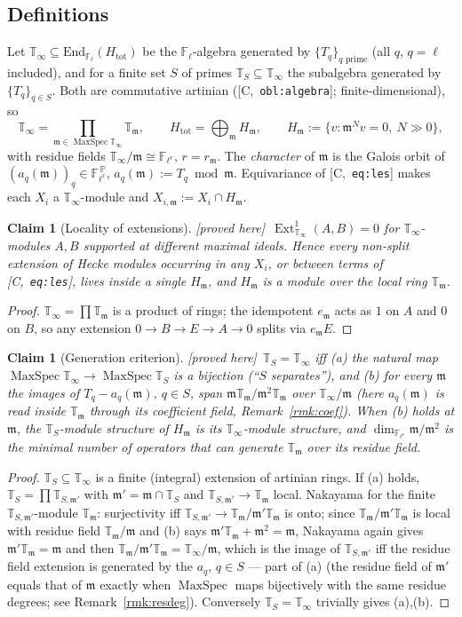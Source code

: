 \documentclass[11pt]{article}
\newtheorem{claim}[theorem]{Claim}
\theoremstyle{remark}
\newcommand{\F}{\mathbb{F}}
\newcommand{\End}{\mathrm{End}}
\newcommand{\Fl}{\F_\ell}
\newcommand{\Flr}{\F_{\ell^r}}
\DeclareMathOperator{\Ext}{Ext}
\DeclareMathOperator{\MaxSpec}{MaxSpec}
\newcommand{\T}{\mathbb{T}}
\newcommand{\m}{\mathfrak{m}}
\newcommand{\Htot}{H_{\mathrm{tot}}}
\newcommand{\HA}[1]{[C,~\texttt{#1}]}      %
\newcommand{\PROVED}{\textsf{[proved here]}}
\begin{document}
\subsection{Definitions}
Let $\T_\infty\subseteq\End_{\Fl}(\Htot)$ be the $\Fl$-algebra generated by $\{T_q\}_{q\text{ prime}}$
(all $q$, $q=\ell$ included), and for a finite set $S$ of primes $\T_S\subseteq\T_\infty$ the
subalgebra generated by $\{T_q\}_{q\in S}$. Both are commutative artinian
(\HA{obl:algebra}; finite-dimensional), so
\[
\T_\infty=\prod_{\m\in\MaxSpec\T_\infty}\T_{\m},\qquad \Htot=\bigoplus_\m H_{\m},\qquad
H_\m:=\{v:\m^Nv=0,\ N\gg0\},
\]
with residue fields $\T_\infty/\m\cong\Flr$, $r=r_\m$. The \emph{character} of $\m$ is the
Galois orbit of $(a_q(\m))_q\in\Flr^{\,\mathbb P}$, $a_q(\m):=T_q\bmod\m$. Equivariance of
\HA{eq:les} makes each $X_i$ a $\T_\infty$-module and $X_{i,\m}:=X_i\cap H_\m$.

\begin{claim}[Locality of extensions]\label{cl:local}\PROVED\
$\Ext^1_{\T_\infty}(A,B)=0$ for $\T_\infty$-modules $A,B$ supported at different maximal
ideals. Hence every non-split extension of Hecke modules occurring in any $X_i$, or between
terms of \HA{eq:les}, lives inside a single $H_\m$, and $H_\m$ is a module over the local
ring $\T_\m$.
\end{claim}
\begin{proof}
$\T_\infty=\prod\T_\m$ is a product of rings; the idempotent $e_\m$ acts as $1$ on $A$ and $0$
on $B$, so any extension $0\to B\to E\to A\to0$ splits via $e_\m E$.
\end{proof}

\begin{claim}[Generation criterion]\label{cl:gen}\PROVED\
$\T_S=\T_\infty$ iff (a) the natural map $\MaxSpec\T_\infty\to\MaxSpec\T_S$ is a bijection
(``$S$ separates''), and (b) for every $\m$ the images of $T_q-a_q(\m)$, $q\in S$, span
$\m\T_\m/\m^2\T_\m$ over $\T_\infty/\m$ (here $a_q(\m)$ is read inside $\T_\m$ through its
coefficient field, Remark~\ref{rmk:coef}). When (b) holds at $\m$, the $\T_S$-module structure of
$H_\m$ \emph{is} its $\T_\infty$-module structure, and $\dim_{\Flr}\m/\m^2$ is the minimal
number of operators that can generate $\T_\m$ over its residue field.
\end{claim}
\begin{proof}
$\T_S\subseteq\T_\infty$ is a finite (integral) extension of artinian rings. If (a) holds,
$\T_S=\prod\T_{S,\m'}$ with $\m'=\m\cap\T_S$ and $\T_{S,\m'}\to\T_\m$ local. Nakayama for the
finite $\T_{S,\m'}$-module $\T_\m$: surjectivity iff $\T_{S,\m'}\to\T_\m/\m'\T_\m$ is onto; since
$\T_\m/\m'\T_\m$ is local with residue field $\T_\m/\m$ and (b) says $\m'\T_\m+\m^2=\m$,
Nakayama again gives $\m'\T_\m=\m$ and then $\T_\m/\m'\T_\m=\T_\infty/\m$, which is the image of
$\T_{S,\m'}$ iff the residue field extension is generated by the $a_q$, $q\in S$ --- part of (a)
(the residue field of $\m'$ equals that of $\m$ exactly when $\MaxSpec$ maps bijectively with
the same residue degrees; see Remark~\ref{rmk:resdeg}). Conversely $\T_S=\T_\infty$ trivially
gives (a),(b).
\end{proof}
\end{document}
